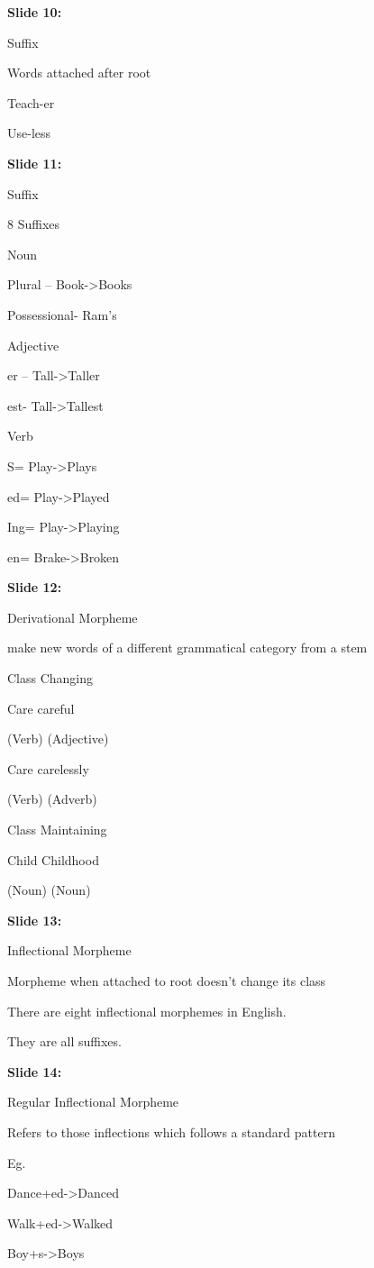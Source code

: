 \documentclass[11pt,a4paper]{article}
\begin{document}
\textbf{Slide 10:}

Suffix

Words attached after root

Teach-er

Use-less

\textbf{Slide 11:}

Suffix

8 Suffixes

Noun

Plural –   Book->Books

Possessional- Ram’s

Adjective

er –   Tall->Taller

est-   Tall->Tallest

Verb

S=     Play->Plays

ed=   Play->Played

Ing=  Play->Playing

en=   Brake->Broken

\textbf{Slide 12:}

Derivational  Morpheme

make new words of a different grammatical category from a stem

Class Changing

Care	         careful

(Verb)            (Adjective)

Care	   	  carelessly

(Verb)                 (Adverb)

Class Maintaining

Child		Childhood

(Noun)                 (Noun)

\textbf{Slide 13:}

Inflectional  Morpheme

Morpheme when attached to root doesn’t change its class

There are eight inflectional morphemes in English.

They are all suffixes.

\textbf{Slide 14:}

Regular Inflectional  Morpheme

Refers to those inflections which follows a standard pattern

Eg.

Dance+ed->Danced

Walk+ed->Walked

Boy+s->Boys
\end{document}
